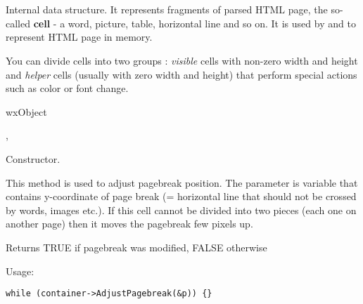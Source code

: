 %
%

\section{}\label{wxhtmlcell}

Internal data structure. It represents fragments of parsed HTML
page, the so-called {\bf cell} - a word, picture, table, horizontal line and so on.
It is used by  and 
 to represent HTML page in memory.

You can divide cells into two groups : {\it visible} cells with non-zero width and
height and {\it helper} cells (usually with zero width and height) that
perform special actions such as color or font change.


wxObject


,


\label{wxhtmlcellwxhtmlcell}


Constructor.

\label{wxhtmlcelladjustpagebreak}


This method is used to adjust pagebreak position. The parameter is
variable that contains y-coordinate of page break (= horizontal line that
should not be crossed by words, images etc.). If this cell cannot be divided
into two pieces (each one on another page) then it moves the pagebreak
few pixels up.

Returns TRUE if pagebreak was modified, FALSE otherwise

Usage: 
\begin{verbatim}
while (container->AdjustPagebreak(&p)) {}
\end{verbatim}

\label{wxhtmlcelldraw}


